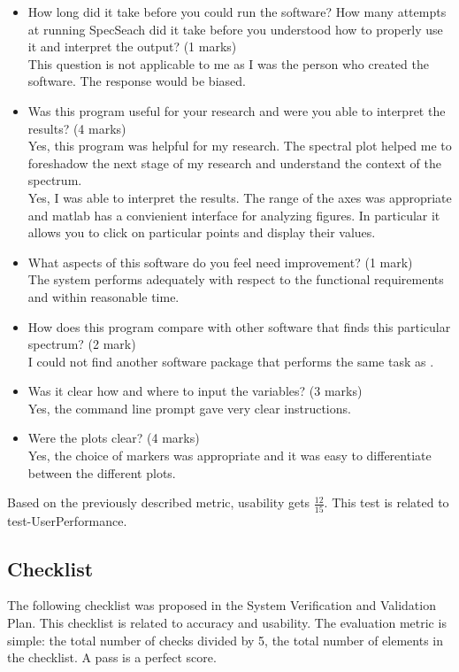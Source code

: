 \documentclass[12pt, titlepage]{article}
\begin{document}
\label{UsabilitySurvey}
\begin{itemize}
	\item How long did it take before you could run the software? How many 
	attempts at running SpecSeach did it take before you understood how to 
	properly use it and interpret the output? (1 marks) \\
	This question is not applicable to me as I was the person who created the 
	software. The response would be biased. 
	\item Was this program useful for your research and were you able to 
	interpret the results? (4 marks) \\ 
	Yes, this program was helpful for my research. The spectral plot helped me 
	to foreshadow the next stage of my research and understand the context of 
	the spectrum.\\
	Yes, I was able to interpret the results. The range of the axes was 
	appropriate and matlab has a convienient interface for analyzing figures. 
	In particular it allows you to click on particular points and display their 
	values. 
	\item What aspects of this software do you feel need improvement? (1 
	mark)\\ 
	The system performs adequately with respect to the functional requirements
	and within reasonable time.
	\item How does this program compare with other software that finds this 
	particular spectrum? (2 mark)\\ 
	I could not find another software package that performs the same task as 
	\progname. 
	\item Was it clear how and where to input the variables? (3 marks) \\
	Yes, the command line prompt gave very clear instructions. 
	\item Were the plots clear? (4 marks) \\
	Yes, the choice of markers was appropriate and it was easy to differentiate 
	between the different plots.
\end{itemize} 
\noindent
Based on the previously described metric, usability gets $\frac{12}{15}$. This 
test is related to test-UserPerformance.
		
\subsection{Checklist}

The following checklist was proposed in the System Verification and 
Validation Plan. This checklist is related to accuracy and usability. The 
evaluation metric is simple: the total number of checks divided by 5, the total 
number of elements in the checklist. A pass is a perfect score.
\end{document}
